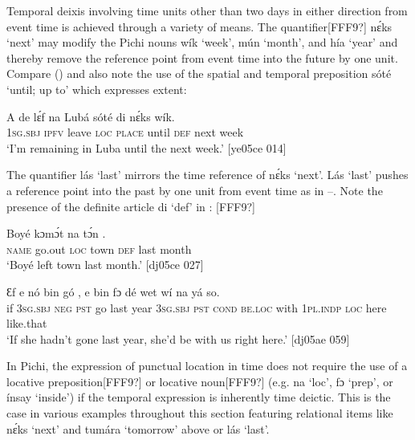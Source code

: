 Temporal deixis involving time units other than two days in either direction from event time is achieved through a variety of means. The quantifier[FFF9?] nɛ́ks ‘next’ may modify the Pichi nouns wík ‘week’, mún ‘month’, and hía ‘year’ and thereby remove the reference point from event time into the future by one unit. Compare () and also note the use of the spatial and temporal preposition sóté ‘until; up to’ which expresses extent: 



\ea%
    \label{ex:key:1014}
    \gll A    de  lɛ́f    na  Lubá  sóté    di  nɛ́ks  wík.\\
\textsc{1sg.sbj}  \textsc{ipfv}  leave  \textsc{loc}  \textsc{place}  until  \textsc{def}  next    week\\

\glt ‘I’m remaining in Luba until the next week.’ [ye05ce 014]
\z

The quantifier lás ‘last’ mirrors the time reference of nɛ́ks ‘next’. Lás ‘last’ pushes a reference point into the past by one unit from event time as in –. Note the presence of the definite article di ‘def’ in : [FFF9?]


\ea%
    \label{ex:key:1015}
    \gll Boyé  kɔmɔ́t  na  tɔ́n       .\\
\textsc{name}  go.out  \textsc{loc}  town  \textsc{def}  last  month\\

\glt ‘Boyé left town last month.’ [dj05ce 027]
\z


\ea%
    \label{ex:key:1016}
    \gll Ɛf  e    nó  bin  gó   ,    e    bin  fɔ    dé
wet    wí    na  yá    so.\\
if  \textsc{3sg.sbj}  \textsc{neg}  \textsc{pst}  go  last  year    \textsc{3sg.sbj}  \textsc{pst}  \textsc{cond}    \textsc{be.loc}
with    \textsc{1pl.indp}  \textsc{loc}  here    like.that\\

\glt ‘If she hadn’t gone last year, she’d be with us right here.’ [dj05ae 059]
\z

In Pichi, the expression of punctual location in time does not require the use of a locative preposition[FFF9?] or locative noun[FFF9?] (e.g. na ‘loc’, fɔ ‘prep’, or ínsay ‘inside’) if the temporal expression is inherently time deictic. This is the case in various examples throughout this section featuring relational items like nɛ́ks ‘next’ and tumára ‘tomorrow’ above or lás ‘last’. 



